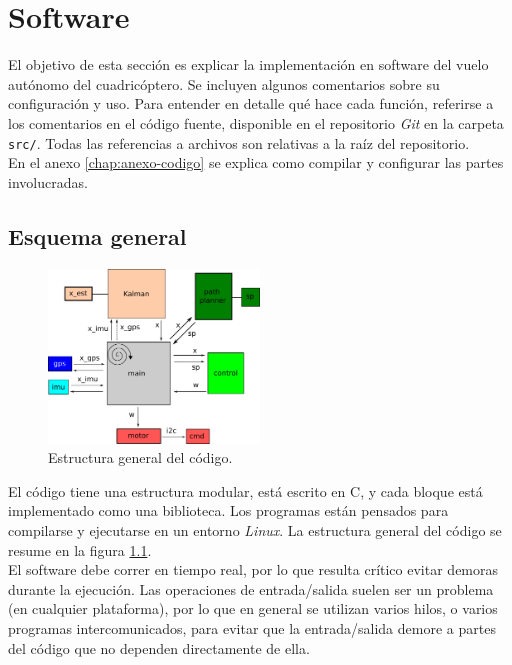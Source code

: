 \documentclass[main]{subfiles}
\begin{document}
\chapter{Software}
\label{chap:Software}

El objetivo de esta sección es explicar la implementaci\'on en software del vuelo autónomo del cuadricóptero. Se incluyen algunos comentarios sobre su configuraci\'on y uso. Para entender en detalle qué hace cada función, referirse a los comentarios en el código fuente, disponible en el repositorio \textit{Git} en la carpeta \verb+src/+. Todas las referencias a archivos son relativas a la raíz del repositorio.\\

En el anexo \ref{chap:anexo-codigo} se explica como compilar y configurar las partes involucradas.

\section{Esquema general}
\label{sec:software:esquema-general}

\begin{figure}
\vspace{-20pt}
\centering
  \includegraphics[width=0.5\textwidth]{./pics_codigo/code.png}
\caption{Estructura general del código.}
\vspace{-20pt}
\label{fig:codigo:code.png}
\end{figure}

El código tiene una estructura modular, está escrito en C, y cada bloque está implementado como una biblioteca. Los programas están pensados para compilarse y ejecutarse en un entorno \emph{Linux}. La estructura general del código se resume en la figura \ref{fig:codigo:code.png}.\\

El software debe correr en tiempo real, por lo que resulta cr\'itico evitar demoras durante la ejecuci\'on. Las operaciones de entrada/salida suelen ser un problema (en cualquier plataforma), por lo que en general se utilizan varios hilos, o varios programas intercomunicados, para evitar que la entrada/salida demore a partes del c\'odigo que no dependen directamente de ella.\\
\end{document}
